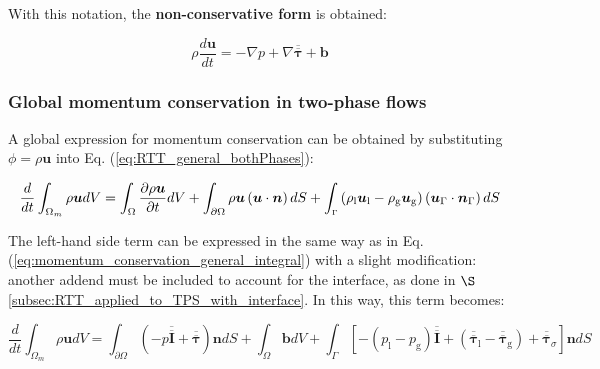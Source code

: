 
With this notation, the \textbf{non-conservative form} is obtained:

\begin{equation}
\rho \frac{d \boldsymbol{u}}{dt} =  - \nabla p + \nabla \overline{\overline{\pmb{\tau}}} +  \boldsymbol{b} 
\end{equation}


\subsubsection*{Global momentum conservation in two-phase flows}

A global expression for momentum conservation can be obtained by substituting $\phi = \rho \boldsymbol{u}$ into Eq. (\ref{eq:RTT_general_bothPhases}):

\begin{equation}
\frac{d}{dt} \int_{\Omega_m} \rho \boldsymbol{u} dV =   \int_{\Omega}  \frac{\partial \rho \boldsymbol{u} }{\partial t}  dV + \int_{\partial \Omega} \rho \boldsymbol{u} \left( \boldsymbol{u} \cdot \boldsymbol{n} \right) dS + \int_\mathsmaller{\Gamma} \left( \rho_\mathrm{l} \boldsymbol{u}_\mathrm{l} - \rho_\mathrm{g} \boldsymbol{u}_\mathrm{g} \right) \left( \boldsymbol{u}_{\scriptsize{\Gamma}} \cdot \boldsymbol{n}_{\scriptsize{\Gamma}} \right) dS
\end{equation}

The left-hand side term can be expressed in the same way as in Eq. (\ref{eq:momentum_conservation_general_integral}) with a slight modification: another addend must be included to account for the interface, as done in $\S$\ref{subsec:RTT_applied_to_TPS_with_interface}. In this way, this term becomes:

\begin{equation}
\frac{d}{dt} \int_{\Omega_m} \rho \boldsymbol{u} dV =  \int_{\partial \Omega} \left( - p \overline{\overline{\pmb{I}}} + \overline{\overline{\pmb{\tau}}} \right) \boldsymbol{n} dS + \int_\Omega \boldsymbol{b} dV + \int_{\Gamma} \left[ - \left( p_\mathrm{l} - p_\mathrm{g} \right) \overline{\overline{\pmb{I}}} + \left( \overline{\overline{\pmb{\tau}}}_\mathrm{l} - \overline{\overline{\pmb{\tau}}}_\mathrm{g}  \right) + \overline{\overline{\pmb{\tau}}}_\sigma  \right] \boldsymbol{n} dS
\end{equation}

